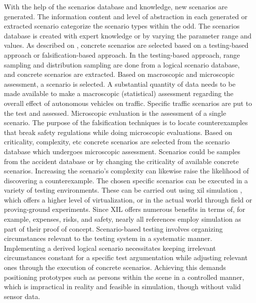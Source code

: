 With the help of the scenarios database and knowledge, new scenarios are generated. The information content and level of abstraction in each generated or extracted scenario categorize the scenario types within the \acrfull{odd}. The scenarios database is created with expert knowledge or by varying the parameter range and values. As described on \parencite{bagschik2018ontology}, concrete scenarios are selected based on a testing-based approach or falsification-based approach. In the testing-based approach, range sampling and distribution sampling are done from a logical scenario database, and concrete scenarios are extracted. Based on macroscopic and microscopic assessment, a scenario is selected. A substantial quantity of data needs to be made available to make a macroscopic (statistical) assessment regarding the overall effect of autonomous vehicles on traffic. Specific traffic scenarios are put to the test and assessed. Microscopic evaluation is the assessment of a single scenario. The purpose of the falsification techniques is to locate counterexamples that break safety regulations while doing microscopic evaluations. Based on criticality, complexity, etc concrete scenarios are selected from the scenario database which undergoes microscopic assessment. Scenarios could be samples from the accident database or by changing the criticality of available concrete scenarios. Increasing the scenario's complexity can likewise raise the likelihood of discovering a counterexample.
The chosen specific scenarios can be executed in a variety of testing environments. These can be carried out using \acrfull{xil} simulation \parencite{x_in_loop}, which offers a higher level of virtualization, or in the actual world through field or proving-ground experiments. Since XIL offers numerous benefits in terms of, for example, expenses, risks, and safety, nearly all references employ simulation as part of their proof of concept.
Scenario-based testing involves organizing circumstances relevant to the testing system in a systematic manner. Implementing a derived logical scenario necessitates keeping irrelevant circumstances constant for a specific test argumentation while adjusting relevant ones through the execution of concrete scenarios. Achieving this demands positioning prototypes such as persons within the scene in a controlled manner, which is impractical in reality and feasible in simulation, though without valid sensor data.

